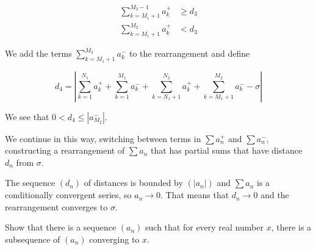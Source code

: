 \begin{solution}
\begin{align*}
\sum_{k = M_1 + 1}^{M_2-1} a^+_k  &\geq d_3 \\
\sum_{k = M_1 + 1}^{M_2} a^+_k & < d_3
\end{align*}

We add the terms $\sum_{k = M_1 + 1}^{M_2} a^-_k$ to the rearrangement and define 

$$
d_4 = |\sum_{k = 1}^{N_1} a^+_k + \sum_{k = 1}^{M_1} a^-_k + \sum_{k = N_1 + 1}^{N_2} a^+_k + \sum_{k = M_1 + 1}^{M_2} a^-_k - \sigma|
$$

We see that $0 < d_4 \leq |a^-_{M_2}|$.

We continue in this way, switching between terms in $\sum a^+_n$ and $\sum a^-_n$, constructing a rearrangement of $\sum a_n$ that has partial sums that have distance $d_n$ from $\sigma$.

The sequence $(d_n)$ of distances is bounded by $(|a_n|)$ and $\sum a_n$ is a conditionally convergent series, so $a_n \to 0$. That means that $d_n \to 0$ and the rearrangement converges to $\sigma$.

\end{solution}

\begin{tcolorbox}[title={Exercise 3.30, page 37}]
Show that there is a sequence $(a_n)$ such that for every real number $x$, there is a subsequence of $(a_n)$ converging to $x$.
\end{tcolorbox}

